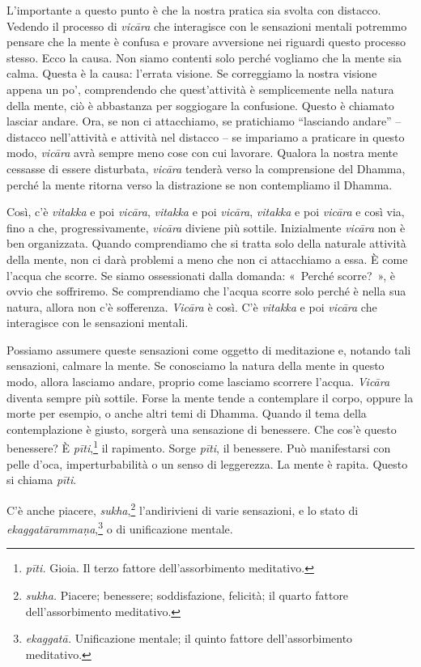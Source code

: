 L'importante a questo punto è che la nostra pratica sia svolta con
distacco. Vedendo il processo di \emph{vicāra} che interagisce con le
sensazioni mentali potremmo pensare che la mente è confusa e provare
avversione nei riguardi questo processo stesso. Ecco la causa. Non siamo
contenti solo perché vogliamo che la mente sia calma. Questa è la causa:
l'errata visione. Se correggiamo la nostra visione appena un po',
comprendendo che quest'attività è semplicemente nella natura della
mente, ciò è abbastanza per soggiogare la confusione. Questo è chiamato
lasciar andare. Ora, se non ci attacchiamo, se pratichiamo ``lasciando
andare'' -- distacco nell'attività e attività nel distacco -- se
impariamo a praticare in questo modo, \emph{vicāra} avrà sempre meno
cose con cui lavorare. Qualora la nostra mente cessasse di essere
disturbata, \emph{vicāra} tenderà verso la comprensione del Dhamma,
perché la mente ritorna verso la distrazione se non contempliamo il
Dhamma.

Così, c'è \emph{vitakka} e poi \emph{vicāra}, \emph{vitakka} e poi
\emph{vicāra}, \emph{vitakka} e poi \emph{vicāra} e così via, fino a
che, progressivamente, \emph{vicāra} diviene più sottile. Inizialmente
\emph{vicāra} non è ben organizzata. Quando comprendiamo che si tratta
solo della naturale attività della mente, non ci darà problemi a meno
che non ci attacchiamo a essa. È come l'acqua che scorre. Se siamo
ossessionati dalla domanda: «~Perché scorre?~», è ovvio che soffriremo.
Se comprendiamo che l'acqua scorre solo perché è nella sua natura,
allora non c'è sofferenza. \emph{Vicāra} è così. C'è \emph{vitakka} e
poi \emph{vicāra} che interagisce con le sensazioni mentali.

Possiamo assumere queste sensazioni come oggetto di meditazione e, notando tali
sensazioni, calmare la mente. Se conosciamo la natura della mente in
questo modo, allora lasciamo andare, proprio come lasciamo scorrere
l'acqua. \emph{Vicāra} diventa sempre più sottile. Forse la mente tende
a contemplare il corpo, oppure la morte per esempio, o anche altri temi
di Dhamma. Quando il tema della contemplazione è giusto, sorgerà una
sensazione di benessere. Che cos'è questo benessere? È
\emph{pīti},\footnote{\emph{pīti.} Gioia. Il terzo fattore
  dell'assorbimento meditativo.} il rapimento. Sorge \emph{pīti}, il
benessere. Può manifestarsi con pelle d'oca, imperturbabilità o un senso
di leggerezza. La mente è rapita. Questo si chiama \emph{pīti}.

C'è anche piacere, \emph{sukha},\footnote{\emph{sukha.} Piacere; benessere;
  soddisfazione, felicità; il quarto fattore dell'assorbimento
  meditativo.} l'andirivieni di varie sensazioni, e lo stato di
\emph{ekaggatārammaṇa},\footnote{\emph{ekaggatā.} Unificazione mentale;
  il quinto fattore dell'assorbimento meditativo.} o di unificazione
mentale.

